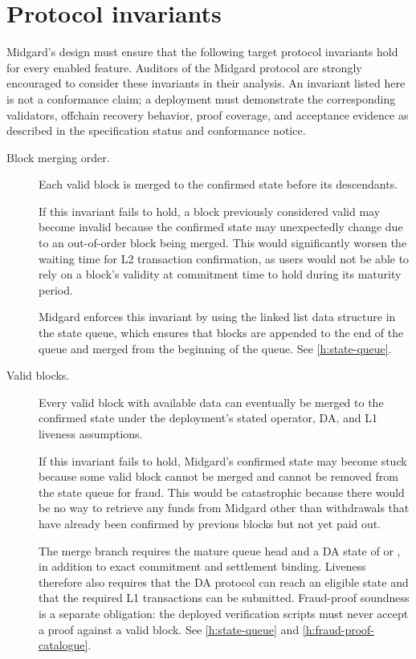 \documentclass[../midgard.tex]{subfiles}
\begin{document}
\section{Protocol invariants}
\label{h:protocol-invariants}

Midgard's design must ensure that the following target protocol invariants hold for every enabled feature.
Auditors of the Midgard protocol are strongly encouraged to consider these invariants in their analysis.
An invariant listed here is not a conformance claim; a deployment must demonstrate the corresponding validators, offchain recovery behavior, proof coverage, and acceptance evidence as described in the specification status and conformance notice.
\begin{description}
  \item[Block merging order.] Each valid block is merged to the confirmed state before its descendants.

    If this invariant fails to hold, a block previously considered valid may become invalid because the confirmed state may unexpectedly change due to an out-of-order block being merged.
    This would significantly worsen the waiting time for L2 transaction confirmation, as users would not be able to rely on a block's validity at commitment time to hold during its maturity period.

    Midgard enforces this invariant by using the linked list data structure in the state queue, which ensures that blocks are appended to the end of the queue and merged from the beginning of the queue.
    See \cref{h:state-queue}.

  \item[Valid blocks.] Every valid block with available data can eventually be merged to the confirmed state under the deployment's stated operator, DA, and L1 liveness assumptions.

    If this invariant fails to hold, Midgard's confirmed state may become stuck because some valid block cannot be merged and cannot be removed from the state queue for fraud.
    This would be catastrophic because there would be no way to retrieve any funds from Midgard other than withdrawals that have already been confirmed by previous blocks but not yet paid out.

    The merge branch requires the mature queue head and a DA state of  or , in addition to exact commitment and settlement binding. Liveness therefore also requires that the DA protocol can reach an eligible state and that the required L1 transactions can be submitted.
    Fraud-proof soundness is a separate obligation: the deployed verification scripts must never accept a proof against a valid block.
    See \cref{h:state-queue} and \cref{h:fraud-proof-catalogue}.


\end{description}
\end{document}
